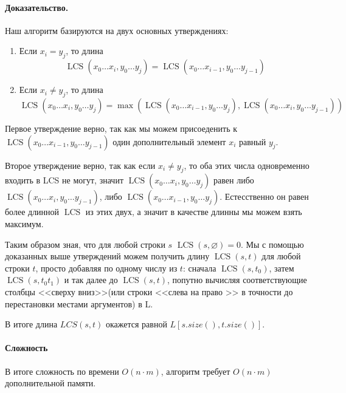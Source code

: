 \documentclass[12pt]{article}
\newcommand{\LCS}{\operatorname{LCS}}
\begin{document}
\paragraph{Доказательство.}
Наш алгоритм базируются на двух основных утверждениях:
\begin{enumerate}
    \item Если $ x_i = y_j $, то длина $$ \LCS(x_0 \dots x_i, y_0 \dots y_j) = 
    \LCS(x_0 \dots x_{i - 1}, y_0 \dots y_{j - 1}) $$
    
    \item Если $ x_i \ne y_j $, то длина $$ \LCS(x_0 \dots x_i, y_0 \dots y_j) =
    \max(\LCS(x_0 \dots x_{i - 1}, y_0 \dots y_j), \LCS(x_0 \dots x_i, y_0
    \dots y_{j - 1})) $$
\end{enumerate}

Первое утверждение верно, так как мы можем присоеденить к 
$ \LCS(x_0 \dots x_{i - 1}, y_0 \dots y_{j - 1}) $ один дополнительный элемент
$ x_i $ равный $ y_j $.

Второе утверждение верно, так как если $ x_i \ne y_j $, то оба этих числа
одновременно входить в LCS не могут, значит $ \LCS(x_0 \dots x_i, y_0 \dots y_j)$
равен либо $ \LCS(x_0 \dots x_i, y_0 \dots y_{j - 1}) $, либо
$ \LCS(x_0 \dots x_{i - 1}, y_0 \dots y_j) $. Естесственно он равен более длинной
$ \LCS $ из этих двух, а значит в качестве длинны мы можем взять максимум.

Таким образом зная, что для любой строки $ s $ $ \LCS(s, \varnothing) = 0 $.
Мы с помощью доказанных выше утверждений можем получить длину $ \LCS(s, t) $ 
для любой строки $ t $, просто добавляя по одному числу из $ t $: сначала 
$ \LCS(s, t_0) $, затем $ \LCS(s, t_0t_1) $ и так далее до $ \LCS(s, t) $,
попутно вычисляя соответствующие столбцы <<сверху вниз>>(или строки <<слева на 
право >> в точности до перестановки местами аргументов) в L.

В итоге длина $ LCS(s , t) $ окажется равной $ L[s.size(), t.size()] $.

\paragraph{Сложность}
В итоге сложность по времени $ O(n \cdot m) $, алгоритм требует $ O(n \cdot m) $ дополнительной памяти.
\end{document}

